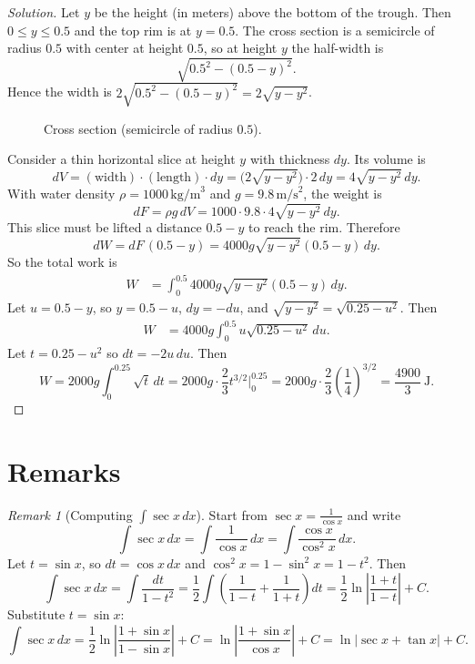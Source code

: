 \documentclass[11pt]{article}
\theoremstyle{definition}
\newenvironment{solution}{\begin{proof}[Solution]}{\end{proof}}
\theoremstyle{remark}
\newtheorem{remark}{Remark}[section]
\begin{document}
\begin{solution}
Let $y$ be the height (in meters) above the bottom of the trough. Then $0\le y\le 0.5$ and the top rim is at $y=0.5$.
The cross section is a semicircle of radius $0.5$ with center at height $0.5$, so at height $y$ the half-width is
\[
\sqrt{0.5^2-(0.5-y)^2}.
\]
Hence the width is $2\sqrt{0.5^2-(0.5-y)^2}=2\sqrt{y-y^2}$.

\begin{figure}[H]
  \centering
  \caption*{Cross section (semicircle of radius $0.5$).}
\end{figure}

Consider a thin horizontal slice at height $y$ with thickness $dy$.
Its volume is
\[
dV=(\text{width})\cdot(\text{length})\cdot dy=\bigl(2\sqrt{y-y^2}\bigr)\cdot 2\,dy=4\sqrt{y-y^2}\,dy.
\]
With water density $\rho=1000\,\text{kg/m}^3$ and $g=9.8\,\text{m/s}^2$, the weight is
\[
dF=\rho g\,dV=1000\cdot 9.8\cdot 4\sqrt{y-y^2}\,dy.
\]
This slice must be lifted a distance $0.5-y$ to reach the rim. Therefore
\[
dW=dF\,(0.5-y)=4000g\sqrt{y-y^2}(0.5-y)\,dy.
\]
So the total work is
\begin{align*}
W
&=\int_{0}^{0.5}4000g\sqrt{y-y^2}(0.5-y)\,dy.
\end{align*}
Let $u=0.5-y$, so $y=0.5-u$, $dy=-du$, and $\sqrt{y-y^2}=\sqrt{0.25-u^2}$. Then
\begin{align*}
W
&=4000g\int_{0}^{0.5}u\sqrt{0.25-u^2}\,du.
\end{align*}
Let $t=0.25-u^2$ so $dt=-2u\,du$. Then
\[
W=2000g\int_{0}^{0.25}\sqrt{t}\,dt=2000g\cdot\frac{2}{3}t^{3/2}\Big|_{0}^{0.25}
=2000g\cdot\frac{2}{3}\left(\frac{1}{4}\right)^{3/2}
=\frac{4900}{3}\ \text{J}.
\]
\end{solution}

\section{Remarks}
\label{sec:remarks}

\begin{remark}[Computing $\int \sec x\,dx$]
\label{rem:int-sec}
Start from $\sec x=\frac{1}{\cos x}$ and write
\[
\int \sec x\,dx=\int \frac{1}{\cos x}\,dx=\int \frac{\cos x}{\cos^2 x}\,dx.
\]
Let $t=\sin x$, so $dt=\cos x\,dx$ and $\cos^2 x=1-\sin^2 x=1-t^2$. Then
\[
\int \sec x\,dx=\int \frac{dt}{1-t^2}
=\frac{1}{2}\int\left(\frac{1}{1-t}+\frac{1}{1+t}\right)dt
=\frac{1}{2}\ln\left|\frac{1+t}{1-t}\right|+C.
\]
Substitute $t=\sin x$:
\[
\int \sec x\,dx=\frac{1}{2}\ln\left|\frac{1+\sin x}{1-\sin x}\right|+C
=\ln\left|\frac{1+\sin x}{\cos x}\right|+C
=\ln|\sec x+\tan x|+C.
\]
\end{remark}
\end{document}
